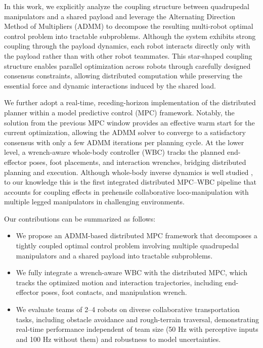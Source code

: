 In this work, we explicitly analyze the coupling structure between quadrupedal manipulators and a shared payload and leverage the Alternating Direction Method of Multipliers (ADMM) \cite{boyd2011distributed} to decompose the resulting multi-robot optimal control problem into tractable subproblems. Although the system exhibits strong coupling through the payload dynamics, each robot interacts directly only with the payload rather than with other robot teammates. This star-shaped coupling structure enables parallel optimization across robots through carefully designed consensus constraints, allowing distributed computation while preserving the essential force and dynamic interactions induced by the shared load.

We further adopt a real-time, receding-horizon implementation of the distributed planner within a model predictive control (MPC) framework. Notably, the solution from the previous MPC window provides an effective warm start for the current optimization, allowing the ADMM solver to converge to a satisfactory consensus with only a few ADMM iterations per planning cycle. At the lower level, a wrench-aware whole-body controller (WBC) tracks the planned end-effector poses, foot placements, and interaction wrenches, bridging distributed planning and execution. Although whole-body inverse dynamics is well studied \cite{bellicoso2019alma}, to our knowledge this is the first integrated distributed MPC–WBC pipeline that accounts for coupling effects in prehensile collaborative loco-manipulation with multiple legged manipulators in challenging environments.

Our contributions can be summarized as follows:
\begin{itemize}
    \item We propose an ADMM-based distributed MPC framework that decomposes a tightly coupled optimal control problem involving multiple quadrupedal manipulators and a shared payload into tractable subproblems.
    \item We fully integrate a wrench-aware WBC with the distributed MPC, which tracks the optimized motion and interaction trajectories, including end-effector poses, foot contacts, and manipulation wrench.
    \item We evaluate teams of 2–4 robots on diverse collaborative transportation tasks, including obstacle avoidance and rough-terrain traversal, demonstrating real-time performance independent of team size (50 Hz with perceptive inputs and 100 Hz without them) and robustness to model uncertainties.
\end{itemize}
